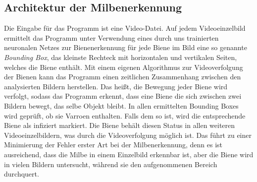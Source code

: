 \documentclass[11pt,a4paper]{article}
\begin{document}
\subsection{Architektur der Milbenerkennung}
Die Eingabe für das Programm ist eine Video-Datei. Auf jedem Videoeinzelbild ermittelt das Programm unter Verwendung eines durch uns trainierten neuronalen Netzes zur Bienenerkennung für jede Biene im Bild eine so genannte \textit{Bounding Box}, das kleinste Rechteck mit horizontalen und vertikalen Seiten, welches die Biene enthält. Mit einem eigenen Algorithmus zur Videoverfolgung der Bienen kann das Programm einen zeitlichen Zusammenhang zwischen den analysierten Bildern herstellen. Das heißt, die Bewegung jeder Biene wird verfolgt, sodass das Programm erkennt, dass eine Biene die sich zwischen zwei Bildern bewegt, das selbe Objekt bleibt. In allen ermittelten Bounding Boxes wird geprüft, ob sie Varroen enthalten. Falls dem so ist, wird die entsprechende Biene als infiziert markiert. Die Biene behält diesen Status in allen weiteren Videoeinzelbildern, was durch die Videoverfolgung möglich ist. Das führt zu einer Minimierung der Fehler erster Art bei der Milbenerkennung, denn es ist ausreichend, dass die Milbe in einem Einzelbild erkennbar ist, aber die Biene wird in vielen Bildern untersucht, während sie den aufgenommenen Bereich durchquert.
\end{document}
